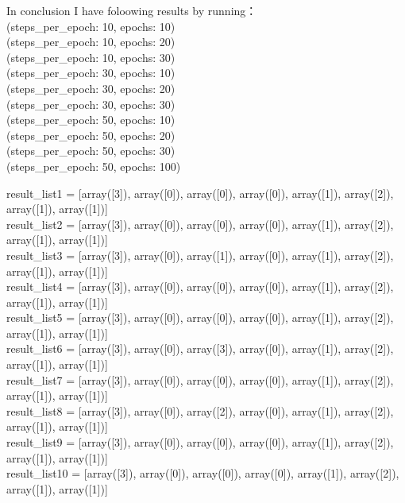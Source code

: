 \documentclass[11pt]{article}
\begin{document}
    In conclusion I have foloowing results by running：\\
(steps\_per\_epoch: 10, epochs: 10)\\
(steps\_per\_epoch: 10, epochs: 20)\\
(steps\_per\_epoch: 10, epochs: 30)\\
(steps\_per\_epoch: 30, epochs: 10)\\
(steps\_per\_epoch: 30, epochs: 20)\\
(steps\_per\_epoch: 30, epochs: 30)\\
(steps\_per\_epoch: 50, epochs: 10)\\
(steps\_per\_epoch: 50, epochs: 20)\\
(steps\_per\_epoch: 50, epochs: 30)\\
(steps\_per\_epoch: 50, epochs: 100)

    result\_list1 = {[}array({[}3{]}), array({[}0{]}), array({[}0{]}),
array({[}0{]}), array({[}1{]}), array({[}2{]}), array({[}1{]}),
array({[}1{]}){]}\\
result\_list2 = {[}array({[}3{]}), array({[}0{]}), array({[}0{]}),
array({[}0{]}), array({[}1{]}), array({[}2{]}), array({[}1{]}),
array({[}1{]}){]}\\
result\_list3 = {[}array({[}3{]}), array({[}0{]}), array({[}1{]}),
array({[}0{]}), array({[}1{]}), array({[}2{]}), array({[}1{]}),
array({[}1{]}){]}\\
result\_list4 = {[}array({[}3{]}), array({[}0{]}), array({[}0{]}),
array({[}0{]}), array({[}1{]}), array({[}2{]}), array({[}1{]}),
array({[}1{]}){]}\\
result\_list5 = {[}array({[}3{]}), array({[}0{]}), array({[}0{]}),
array({[}0{]}), array({[}1{]}), array({[}2{]}), array({[}1{]}),
array({[}1{]}){]}\\
result\_list6 = {[}array({[}3{]}), array({[}0{]}), array({[}3{]}),
array({[}0{]}), array({[}1{]}), array({[}2{]}), array({[}1{]}),
array({[}1{]}){]}\\
result\_list7 = {[}array({[}3{]}), array({[}0{]}), array({[}0{]}),
array({[}0{]}), array({[}1{]}), array({[}2{]}), array({[}1{]}),
array({[}1{]}){]}\\
result\_list8 = {[}array({[}3{]}), array({[}0{]}), array({[}2{]}),
array({[}0{]}), array({[}1{]}), array({[}2{]}), array({[}1{]}),
array({[}1{]}){]}\\
result\_list9 = {[}array({[}3{]}), array({[}0{]}), array({[}0{]}),
array({[}0{]}), array({[}1{]}), array({[}2{]}), array({[}1{]}),
array({[}1{]}){]}\\
result\_list10 = {[}array({[}3{]}), array({[}0{]}), array({[}0{]}),
array({[}0{]}), array({[}1{]}), array({[}2{]}), array({[}1{]}),
array({[}1{]}){]}
\end{document}
